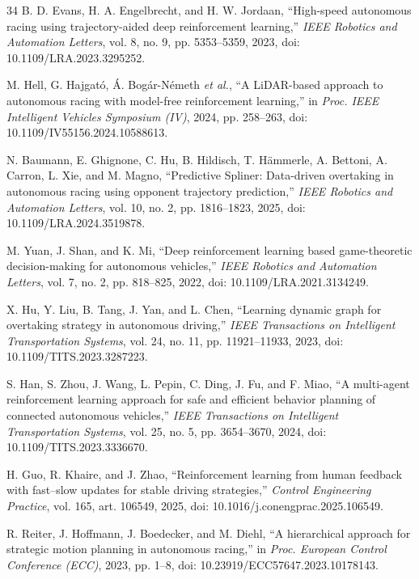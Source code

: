 \documentclass[journal,twoside,web]{ieeecolor}
\begin{document}
\begin{thebibliography}{34}
B. D. Evans, H. A. Engelbrecht, and H. W. Jordaan,
``High-speed autonomous racing using trajectory-aided deep reinforcement
learning,'' \emph{IEEE Robotics and Automation Letters}, vol. 8, no. 9,
pp. 5353--5359, 2023, doi: 10.1109/LRA.2023.3295252.

M. Hell, G. Hajgat\'o, \'A. Bog\'ar-N\'emeth \emph{et al.},
``A LiDAR-based approach to autonomous racing with model-free reinforcement
learning,'' in \emph{Proc. IEEE Intelligent Vehicles Symposium (IV)}, 2024,
pp. 258--263, doi: 10.1109/IV55156.2024.10588613.

N. Baumann, E. Ghignone, C. Hu, B. Hildisch, T. H\"ammerle,
A. Bettoni, A. Carron, L. Xie, and M. Magno,
``Predictive Spliner: Data-driven overtaking in autonomous racing using
opponent trajectory prediction,'' \emph{IEEE Robotics and Automation
Letters}, vol. 10, no. 2, pp. 1816--1823, 2025,
doi: 10.1109/LRA.2024.3519878.

M. Yuan, J. Shan, and K. Mi,
``Deep reinforcement learning based game-theoretic decision-making for
autonomous vehicles,'' \emph{IEEE Robotics and Automation Letters}, vol. 7,
no. 2, pp. 818--825, 2022, doi: 10.1109/LRA.2021.3134249.

X. Hu, Y. Liu, B. Tang, J. Yan, and L. Chen,
``Learning dynamic graph for overtaking strategy in autonomous driving,''
\emph{IEEE Transactions on Intelligent Transportation Systems}, vol. 24,
no. 11, pp. 11921--11933, 2023, doi: 10.1109/TITS.2023.3287223.

S. Han, S. Zhou, J. Wang, L. Pepin, C. Ding, J. Fu, and F. Miao,
``A multi-agent reinforcement learning approach for safe and efficient
behavior planning of connected autonomous vehicles,''
\emph{IEEE Transactions on Intelligent Transportation Systems}, vol. 25,
no. 5, pp. 3654--3670, 2024, doi: 10.1109/TITS.2023.3336670.

H. Guo, R. Khaire, and J. Zhao,
``Reinforcement learning from human feedback with fast--slow updates for
stable driving strategies,'' \emph{Control Engineering Practice}, vol. 165,
art. 106549, 2025, doi: 10.1016/j.conengprac.2025.106549.

R. Reiter, J. Hoffmann, J. Boedecker, and M. Diehl,
``A hierarchical approach for strategic motion planning in autonomous
racing,'' in \emph{Proc. European Control Conference (ECC)}, 2023, pp. 1--8,
doi: 10.23919/ECC57647.2023.10178143.


\end{thebibliography}
\end{document}
